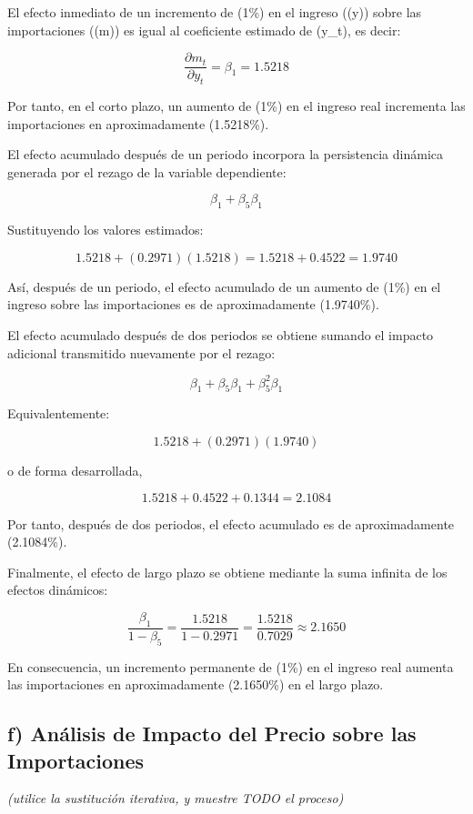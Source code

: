 \documentclass[
  11pt,
  letterpaper,
  DIV=11,
  numbers=noendperiod]{scrartcl}
\begin{document}
El efecto inmediato de un incremento de (1\%) en el ingreso ((y)) sobre
las importaciones ((m)) es igual al coeficiente estimado de (y\_t), es
decir:

\[
\frac{\partial m_t}{\partial y_t} = \beta_1 = 1.5218
\]

Por tanto, en el corto plazo, un aumento de (1\%) en el ingreso real
incrementa las importaciones en aproximadamente (1.5218\%).

El efecto acumulado después de un periodo incorpora la persistencia
dinámica generada por el rezago de la variable dependiente:

\[
\beta_1 + \beta_5 \beta_1
\]

Sustituyendo los valores estimados:

\[
1.5218 + (0.2971)(1.5218) = 1.5218 + 0.4522 = 1.9740
\]

Así, después de un periodo, el efecto acumulado de un aumento de (1\%)
en el ingreso sobre las importaciones es de aproximadamente (1.9740\%).

El efecto acumulado después de dos periodos se obtiene sumando el
impacto adicional transmitido nuevamente por el rezago:

\[
\beta_1 + \beta_5 \beta_1 + \beta_5^2 \beta_1
\]

Equivalentemente:

\[
1.5218 + (0.2971)(1.9740)
\]

o de forma desarrollada,

\[
1.5218 + 0.4522 + 0.1344 = 2.1084
\]

Por tanto, después de dos periodos, el efecto acumulado es de
aproximadamente (2.1084\%).

Finalmente, el efecto de largo plazo se obtiene mediante la suma
infinita de los efectos dinámicos:

\[
\frac{\beta_1}{1-\beta_5}
=
\frac{1.5218}{1-0.2971}
=
\frac{1.5218}{0.7029}
\approx 2.1650
\]

En consecuencia, un incremento permanente de (1\%) en el ingreso real
aumenta las importaciones en aproximadamente (2.1650\%) en el largo
plazo.

\subsection{f) Análisis de Impacto del Precio sobre las
Importaciones}\label{f-anuxe1lisis-de-impacto-del-precio-sobre-las-importaciones}

\emph{(utilice la sustitución iterativa, y muestre TODO el proceso)}
\end{document}
